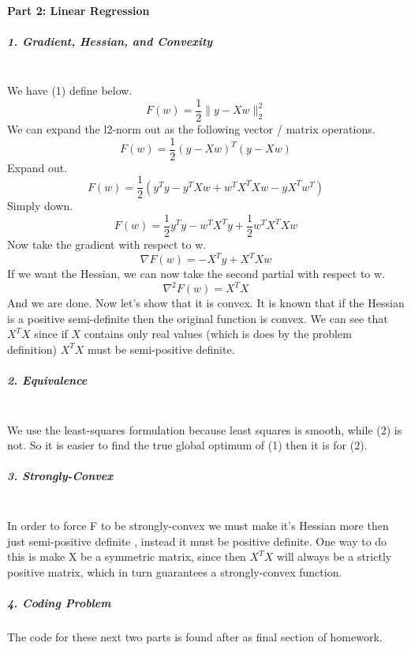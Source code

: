 \documentclass[12pt]{article}
\begin{document}
    \paragraph{Part 2: Linear Regression}
    \subparagraph{1. Gradient, Hessian, and Convexity}~\\
    We have (1) define below.
    \[
        F(w) = \frac{1}{2} \| y - Xw \|^{2}_{2}
    \]
    We can expand the l2-norm out as the following vector / matrix operations.
    \[
        F(w) = \frac{1}{2} (y - Xw)^{T}(y - Xw)
    \]
    Expand out.
    \[
        F(w) = \frac{1}{2} (y^{T}y - y^{T} X w + w^{T} X^{T} X w - y X^{T} w^{T})
    \]
    Simply down.
    \[
        F(w) = \frac{1}{2} y^{T}y - w^{T} X^{T} y + \frac{1}{2} w^{T} X^{T} X w
    \]
    Now take the gradient with respect to w.
    \[
        \nabla F(w) = -X^{T}y + X^{T} X w 
    \]
    If we want the Hessian, we can now take the second partial with respect to w.
    \[
        \nabla^{2} F(w) = X^{T} X
    \]
    And we are done. Now let's show that it is convex. It is known that if the Hessian is a 
    positive semi-definite then the original function is convex. We can see that \(X^{T} X\) 
    since if \(X\) contains only real values (which is does by the problem definition) \(X^{T} X\)
    must be semi-positive definite.

    \subparagraph{2. Equivalence}~\\
    We use the least-squares formulation because least squares is smooth, while (2) is not.
    So it is easier to find the true global optimum of (1) then it is for (2).

    \subparagraph{3. Strongly-Convex}~\\
    In order to force F to be strongly-convex we must make it's Hessian more then just semi-positive definite
    , instead it must be positive definite. One way to do this is make X be a symmetric matrix, since then
    \(X^{T}X\) will always be a strictly positive matrix, which in turn guarantees a strongly-convex function.

    \subparagraph{4. Coding Problem}
    The code for these next two parts is found after as final section of homework.
\end{document}
